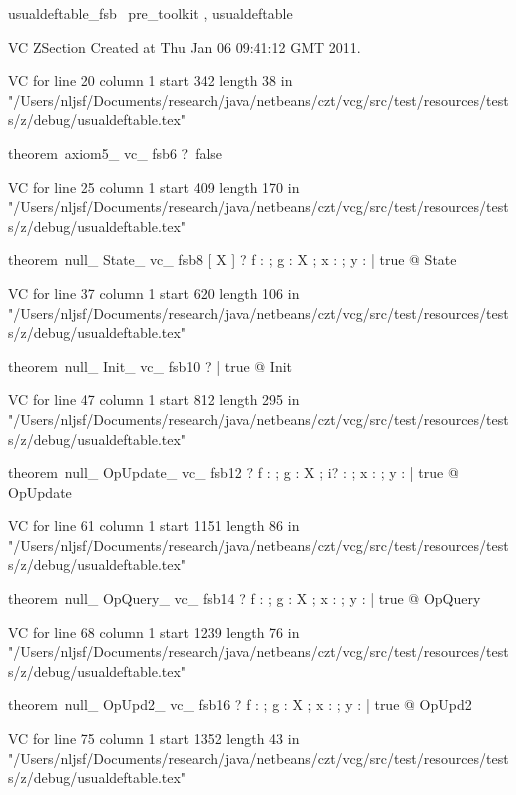 \documentclass{article}
\begin{document}

\begin{zsection}\SECTION usualdeftable\_fsb \parents~pre\_toolkit , usualdeftable
\end{zsection}
VC ZSection Created at Thu Jan 06 09:41:12 GMT 2011.

VC for line 20 column 1 start 342 length 38 in "/Users/nljsf/Documents/research/java/netbeans/czt/vcg/src/test/resources/tests/z/debug/usualdeftable.tex"
\begin{zed}theorem~axiom5\_ vc\_ fsb6 \vdash ?~false
\end{zed}
VC for line 25 column 1 start 409 length 170 in "/Users/nljsf/Documents/research/java/netbeans/czt/vcg/src/test/resources/tests/z/debug/usualdeftable.tex"
\begin{zed}theorem~null\_ State\_ vc\_ fsb8 [ X ] \vdash ? \forall f : \nat \fun \nat ; g : X ; x : \nat ; y : \power \nat | true @ \pre State
\end{zed}
VC for line 37 column 1 start 620 length 106 in "/Users/nljsf/Documents/research/java/netbeans/czt/vcg/src/test/resources/tests/z/debug/usualdeftable.tex"
\begin{zed}theorem~null\_ Init\_ vc\_ fsb10 \vdash ? \forall | true @ \pre Init
\end{zed}
VC for line 47 column 1 start 812 length 295 in "/Users/nljsf/Documents/research/java/netbeans/czt/vcg/src/test/resources/tests/z/debug/usualdeftable.tex"
\begin{zed}theorem~null\_ OpUpdate\_ vc\_ fsb12 \vdash ? \forall f : \nat \fun \nat ; g : X ; i? : \nat ; x : \nat ; y : \power \nat | true @ \pre OpUpdate
\end{zed}
VC for line 61 column 1 start 1151 length 86 in "/Users/nljsf/Documents/research/java/netbeans/czt/vcg/src/test/resources/tests/z/debug/usualdeftable.tex"
\begin{zed}theorem~null\_ OpQuery\_ vc\_ fsb14 \vdash ? \forall f : \nat \fun \nat ; g : X ; x : \nat ; y : \power \nat | true @ \pre OpQuery
\end{zed}
VC for line 68 column 1 start 1239 length 76 in "/Users/nljsf/Documents/research/java/netbeans/czt/vcg/src/test/resources/tests/z/debug/usualdeftable.tex"
\begin{zed}theorem~null\_ OpUpd2\_ vc\_ fsb16 \vdash ? \forall f : \nat \fun \nat ; g : X ; x : \nat ; y : \power \nat | true @ \pre OpUpd2
\end{zed}
VC for line 75 column 1 start 1352 length 43 in "/Users/nljsf/Documents/research/java/netbeans/czt/vcg/src/test/resources/tests/z/debug/usualdeftable.tex"
\end{document}
